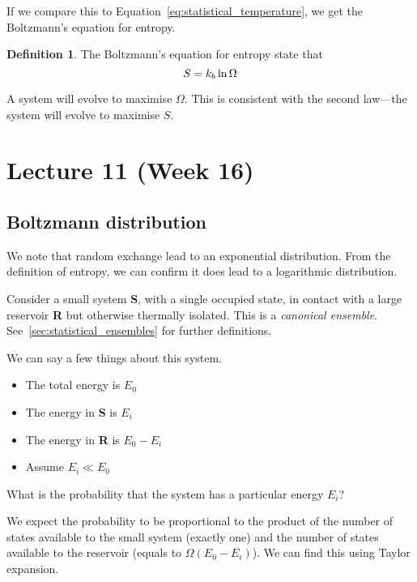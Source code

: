 \documentclass[12pt,chapterprefix=false,dvipsnames]{scrbook}
\theoremstyle{dotless}
\theoremstyle{definition}
\newtheorem{protodefinition}{Definition}[section]
\newenvironment{definition}
{\colorlet{shadecolor}{black!15}\begin{shaded}\begin{protodefinition}}
			{\end{protodefinition}\end{shaded}}
\begin{document}
If we compare this to Equation~\ref{eq:statistical_temperature}, we get
the Boltzmann's equation for entropy.

\begin{definition}
	The Boltzmann's equation for entropy state that
	\begin{equation}
		\label{eq:boltzmann_entropy}
		S = k_b \naturallogarithm{\Omega}
	\end{equation}

	A system will evolve to maximise $\Omega$. This
	is consistent with the second law---the system will evolve to
	maximise $S$.
\end{definition}

\chapter{Lecture 11 (Week 16)}%
\label{cha:lecture_11}

\section{Boltzmann distribution}%
\label{sec:bolztmann_distribution}

We note that random exchange lead to an exponential
distribution. From the definition of entropy, we can confirm it
does lead to a logarithmic distribution.

Consider a small system \textbf{S}, with a single
occupied state, in contact with a large reservoir
\textbf{R}  but otherwise thermally isolated. This
is a \textit{canonical ensemble}. See~\ref{sec:statistical_ensembles} for
further definitions.

We can say a few things about this system.
\begin{itemize}
	\item The total energy is $E_0$
	\item The energy in \textbf{S} is $E_i$
	\item The energy in \textbf{R} is $E_0 - E_i$
	\item Assume $E_i \ll E_0$
\end{itemize}

What is the probability that the system has a particular energy
$E_i$?

We expect the probability to be proportional to the product of
the number of states available to the small system (exactly one)
and the number of states available to the reservoir (equals to
$\Omega\left(E_0 - E_i\right)$). We can find this using Taylor
expansion.
\end{document}
